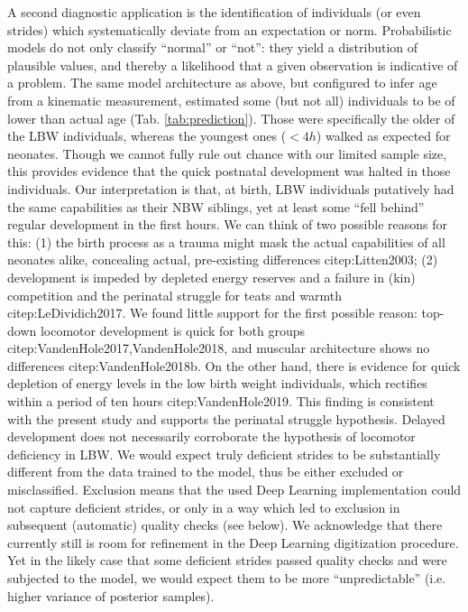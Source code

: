 \documentclass[10pt,a4paper]{article}
\begin{document}
\bigskip
A second diagnostic application is the identification of individuals (or even strides) which systematically deviate from an expectation or norm.
Probabilistic models do not only classify ``normal'' or ``not'': they yield a distribution of plausible values, and thereby a likelihood that a given observation is indicative of a problem.
The same model architecture as above, but configured to infer age from a kinematic measurement, estimated some (but not all) individuals to be of lower than actual age (Tab. \ref{tab:prediction}).
Those were specifically the older of the LBW individuals, whereas the youngest ones (\(<4h\)) walked as expected for neonates.
Though we cannot fully rule out chance with our limited sample size, this provides evidence that the quick postnatal development was halted in those individuals.
Our interpretation is that, at birth, LBW individuals putatively had the same capabilities as their NBW siblings, yet at least some ``fell behind'' regular development in the first hours.
We can think of two possible reasons for this: (1) the birth process as a trauma might mask the actual capabilities of all neonates alike, concealing actual, pre-existing differences citep:Litten2003; (2) development is impeded by depleted energy reserves and a failure in (kin) competition and the perinatal struggle for teats and warmth citep:LeDividich2017.
We found little support for the first possible reason: top-down locomotor development is quick for both groups citep:VandenHole2017,VandenHole2018, and muscular architecture shows no differences citep:VandenHole2018b.
On the other hand, there is evidence for quick depletion of energy levels in the low birth weight individuals, which rectifies within a period of ten hours citep:VandenHole2019.
This finding is consistent with the present study and supports the perinatal struggle hypothesis.
Delayed development does not necessarily corroborate the hypothesis of locomotor deficiency in LBW.
We would expect truly deficient strides to be substantially different from the data trained to the model, thus be either excluded or misclassified.
Exclusion means that the used Deep Learning implementation could not capture deficient strides, or only in a way which led to exclusion in subsequent (automatic) quality checks (see below).
We acknowledge that there currently still is room for refinement in the Deep Learning digitization procedure.
Yet in the likely case that some deficient strides passed quality checks and were subjected to the model, we would expect them to be more ``unpredictable'' (i.e. higher variance of posterior samples).
\end{document}
